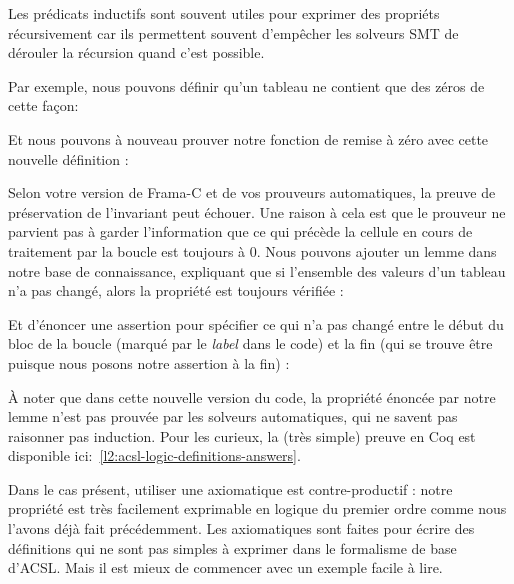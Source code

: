 

Les prédicats inductifs sont souvent utiles pour exprimer des propriéts récursivement
car ils permettent souvent d'empêcher les solveurs SMT de dérouler la récursion quand
c'est possible.


Par exemple, nous pouvons définir qu'un tableau ne contient que des zéros de cette
façon:




Et nous pouvons à nouveau prouver notre fonction de remise à zéro avec cette
nouvelle définition :






Selon votre version de Frama-C et de vos prouveurs automatiques, la preuve de
préservation de l'invariant peut échouer. Une raison à cela est que le prouveur ne
parvient pas à garder l'information que ce qui précède la cellule en cours de
traitement par la boucle est toujours à 0. Nous pouvons ajouter un lemme dans
notre base de connaissance, expliquant que si l'ensemble des valeurs d'un tableau
n'a pas changé, alors la propriété est toujours vérifiée :






Et d'énoncer une assertion pour spécifier ce qui n'a pas changé entre le début
du bloc de la boucle (marqué par le \textit{label}  dans le code) et la fin (qui se
trouve être  puisque nous posons notre assertion à la fin) :






À noter que dans cette nouvelle version du code, la propriété énoncée par notre
lemme n'est pas prouvée par les solveurs automatiques, qui ne savent pas raisonner
pas induction. Pour les curieux, la (très simple) preuve en Coq est disponible
ici:~\ref{l2:acsl-logic-definitions-answers}.



Dans le cas présent, utiliser une axiomatique est contre-productif : notre
propriété est très facilement exprimable en logique du premier ordre comme
nous l'avons déjà fait précédemment. Les axiomatiques sont faites pour écrire
des définitions qui ne sont pas simples à exprimer dans le formalisme de base
d'ACSL. Mais il est mieux de commencer avec un exemple facile à lire.




